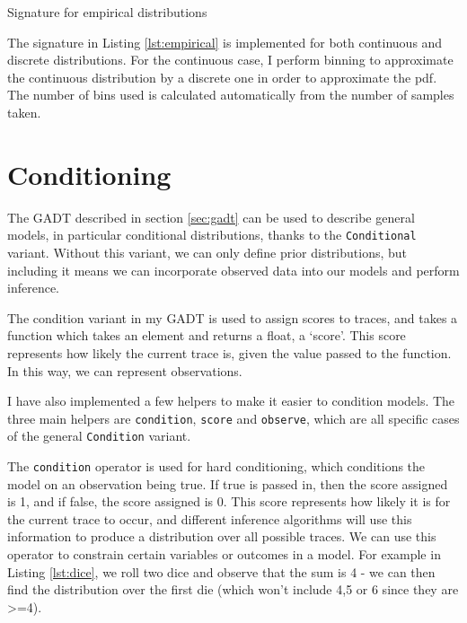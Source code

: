 \begin{listing}[ht]
	\caption{Signature for empirical distributions}
	\label{lst:empirical}
\end{listing}
	
The signature in Listing \ref{lst:empirical} is implemented for both continuous and discrete distributions. For the continuous case, I perform binning to approximate the continuous distribution by a discrete one in order to approximate the pdf. The number of bins used is calculated automatically from the number of samples taken.
		
\section{Conditioning} \label{sec:condition}
	
The GADT described in section \ref{sec:gadt} can be used to describe general models, in particular conditional distributions, thanks to the \texttt{Conditional} variant. Without this variant, we can only define prior distributions, but including it means we can incorporate observed data into our models and perform inference.
	
The condition variant in my GADT is used to assign scores to traces, and takes a function which takes an element and returns a float, a `score'. This score represents how likely the current trace is, given the value passed to the function. In this way, we can represent observations.
		
I have also implemented a few helpers to make it easier to condition models. The three main helpers are \texttt{condition}, \texttt{score} and \texttt{observe}, which are all specific cases of the general \texttt{Condition} variant. 
		
The \texttt{condition} operator is used for hard conditioning, which conditions the model on an observation being true. If true is passed in, then the score assigned is 1, and if false, the score assigned is 0. This score represents how likely it is for the current trace to occur, and different inference algorithms will use this information to produce a distribution over all possible traces. We can use this operator to constrain certain variables or outcomes in a model. For example in Listing \ref{lst:dice}, we roll two dice and observe that the sum is 4 - we can then find the distribution over the first die (which won't include 4,5 or 6 since they are >=4).
						
